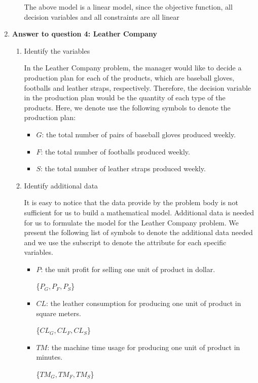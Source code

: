 \documentclass[11pt]{article}
\begin{document}
\begin{enumerate}
\begin{enumerate}
    The above model is a linear model, since the objective function, all decision variables and all constraints are all linear
\end{enumerate}

\item \textbf{Answer to question 4: Leather Company} \par

\renewcommand{\labelenumii}{{\alph{enumii}}}
\begin{enumerate}
    \item Identify the variables \par
    In the Leather Company problem, the manager would like to decide a production plan for each of the products, which are baseball gloves, footballs and leather straps, respectively. Therefore, the decision variable in the production plan would be the quantity of each type of the products. Here, we denote use the following symbols to denote the production plan:
    \begin{itemize}
        \item $G$: the total number of pairs of baseball gloves produced weekly.
        \item $F$: the total number of footballs produced weekly.
        \item $S$: the total number of leather straps produced weekly.
    \end{itemize}
    \item Identify additional data \par
    It is easy to notice that the data provide by the problem body is not sufficient for us to build a mathematical model. Additional data is needed for us to formulate the model for the Leather Company problem. We present the following list of symbols to denote the additional data needed and we use the subscript to denote the attribute for each specific variables. 
    \begin{itemize}
        \item $P$: the unit profit for selling one unit of product in dollar. \par
        \{$P_G, P_F, P_S$\}
        \item $\mathit{CL}$: the leather consumption for producing one unit of product in square meters.\par
        \{$\mathit{CL}_G, \mathit{CL}_F, \mathit{CL}_S$\}
        \item $\mathit{TM}$: the machine time usage for producing one unit of product in minutes. \par
        \{$\mathit{TM}_G, \mathit{TM}_F, \mathit{TM}_S$\}
    \end{itemize}
    

\end{enumerate}
\end{enumerate}
\end{document}
